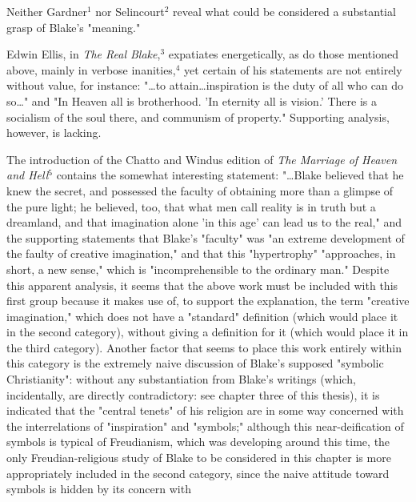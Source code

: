 \newpage

{}

Neither Gardner$^{1}$ nor Selincourt$^{2}$ reveal what could be
considered a substantial grasp of Blake's "meaning."\par
\vspace*{0.5\baselineskip}
Edwin Ellis, in \textit{The Real Blake},$^{3}$ expatiates energetically, as
do those mentioned above, mainly in verbose inanities,$^{4}$ yet certain of his statements
are not entirely without value, for instance: "\dots to attain\dots inspiration is
the duty of all who can do so\dots" and "In Heaven all is brotherhood. 'In eternity all is vision.' There is
a socialism of the soul there, and communism of property." Supporting analysis, however, is lacking.\par
\vspace*{0.5\baselineskip}
The introduction of the Chatto and Windus edition of
\textit{The Marriage of Heaven and Hell}$^{5}$ contains the somewhat
interesting statement: "\dots Blake believed that he knew the
secret, and possessed the faculty of obtaining more than a glimpse of the pure light; he believed, too, that
what men call reality is in truth but a dreamland, and that imagination alone 'in this age' can lead us to the real," and
the supporting statements that Blake's "faculty" was "an extreme development of the
faulty of creative imagination," and that this "hypertrophy" "approaches, in short, a new sense," which is
"incomprehensible to the ordinary man." Despite this apparent analysis, it seems that the above work must
be included with this first group because it makes use of, to support the explanation, the
term "creative imagination," which does not have a "standard" definition (which would
place it in the second category), without giving a definition for it (which would place it in the
third category). Another factor that seems to place this work entirely within
this category is the extremely naive discussion of Blake's supposed "symbolic Christianity": without
any substantiation from Blake's writings (which, incidentally, are directly contradictory: see chapter three of this thesis),
it is indicated that the "central tenets" of his religion are in some way concerned with the interrelations
of "inspiration" and "symbols;" although this near-deification of symbols is typical of Freudianism, which
was developing around this time, the only Freudian-religious study of Blake to be considered in this chapter is more
appropriately included in the second category, since the naive attitude toward symbols is hidden by its concern with
